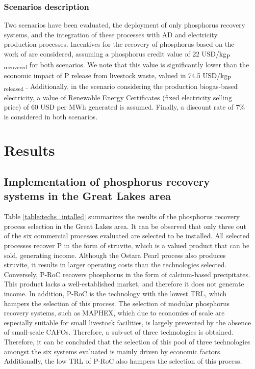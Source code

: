\documentclass[authoryear]{elsarticle}
\begin{document}
\subsubsection{Scenarios description}
Two scenarios have been evaluated, the deployment of only phosphorus recovery systems, and the integration of these processes with AD and electricity production processes. 
Incentives for the recovery of phosphorus based on the work of \citet{sampat_economic_2018} are considered, assuming a phosphorus credit value of 22 USD/kg\textsubscript{P recovered} for both scenarios. We note that this value is significantly lower than the economic impact of P release from livestock waste, valued in 74.5 USD/kg\textsubscript{P released} \citep{sampat2021valuing}. Additionally, in the scenario considering the production biogas-based electricity, a value of Renewable Energy Certificates (fixed electricity selling price) of 60 USD per MWh generated is assumed. Finally, a discount rate of 7\% is considered in both scenarios. 

\section{Results}
\subsection{Implementation of phosphorus recovery systems in the Great Lakes area}
Table \ref{table:techs_intalled} 
summarizes the results of the phosphorus recovery process selection 
in the Great Lakes area.
It can be observed that only three out of the six commercial processes evaluated are selected to be installed. All selected processes recover P in the form of struvite, which is a valued product that can be sold, generating income. Although the Ostara Pearl process also produces struvite, it results in larger operating costs than the technologies selected. Conversely, P-RoC recovers phosphorus in the form of calcium-based precipitates. This product lacks a well-established market, and therefore it does not generate income. In addition, P-RoC is the technology with the lowest TRL, which hampers the selection of this process. The selection of modular phosphorus recovery systems, such as MAPHEX, which due to economies of scale are especially suitable for small livestock facilities, is largely prevented by the absence of small-scale CAFOs. Therefore, a sub-set of three technologies is obtained. Therefore, it can be concluded that the selection of this pool of three technologies amongst the six systems evaluated is mainly driven by economic factors. Additionally, the low TRL of P-RoC also hampers the selection of this process.
		
\end{document}
